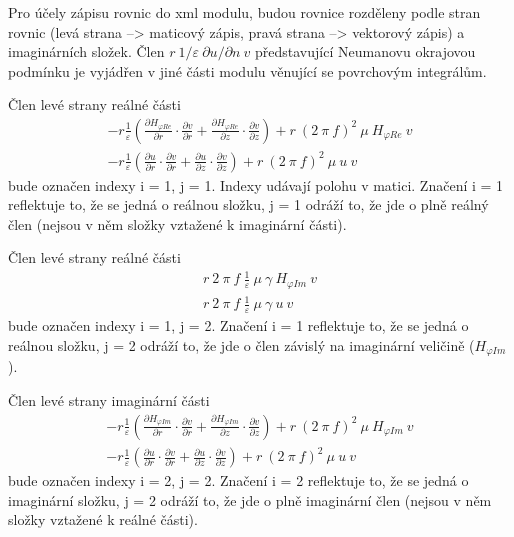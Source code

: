 \documentclass[12pt,a4paper,oneside]{article}
\numberwithin{equation}{section} %
\numberwithin{figure}{section} %
\numberwithin{table}{section} %
\begin{document}
Pro účely zápisu rovnic do xml modulu, budou rovnice rozděleny podle stran rovnic (levá strana --> maticový zápis, pravá strana --> vektorový zápis) a imaginárních složek. Člen $r ~ 1/ \varepsilon ~ \partial u / \partial n ~ v$ představující Neumanovu okrajovou podmínku je vyjádřen v jiné části modulu věnující se povrchovým integrálům.

Člen levé strany reálné části
\begin{subequations}
\begin{gather}
- r \frac{1}{\varepsilon} \left( \frac{\partial H _{\varphi Re}}{\partial r} \cdot \frac{\partial v}{\partial r} + \frac{\partial H _{\varphi Re}}{\partial z} \cdot \frac{\partial v}{\partial z} \right) + r ~ (2 ~ \pi ~ f) ^2 ~ \mu ~ H _{\varphi Re} ~ v
\\
- r \frac{1}{\varepsilon} \left( \frac{\partial u}{\partial r} \cdot \frac{\partial v}{\partial r} + \frac{\partial u}{\partial z} \cdot \frac{\partial v}{\partial z} \right) + r ~ (2 ~ \pi ~ f) ^2 ~ \mu  ~ u ~ v
\end{gather}
\end{subequations}
bude označen indexy i = 1, j = 1. Indexy udávají polohu v matici. Značení i = 1 reflektuje to, že se jedná o reálnou složku, j = 1 odráží to, že jde o plně reálný člen (nejsou v něm složky vztažené k imaginární části). 

Člen levé strany reálné části
\begin{subequations}
\begin{gather}
r ~ 2 ~ \pi ~ f ~ \frac{1}{\varepsilon} ~ \mu ~ \gamma ~ H _{\varphi Im} ~ v
\\
r ~ 2 ~ \pi ~ f ~ \frac{1}{\varepsilon} ~ \mu ~ \gamma ~ u ~ v
\end{gather}
\end{subequations}
bude označen indexy i = 1, j = 2. Značení i = 1 reflektuje to, že se jedná o reálnou složku, j = 2 odráží to, že jde o člen závislý na imaginární veličině ($H _{\varphi Im}$).


Člen levé strany imaginární části
\begin{subequations}
\begin{gather}
- r \frac{1}{\varepsilon} \left( \frac{\partial H _{\varphi Im}}{\partial r} \cdot \frac{\partial v}{\partial r} + \frac{\partial H _{\varphi Im}}{\partial z} \cdot \frac{\partial v}{\partial z} \right) + r ~ (2 ~ \pi ~ f) ^2 ~ \mu ~ H _{\varphi Im} ~ v
\\
- r \frac{1}{\varepsilon} \left( \frac{\partial u}{\partial r} \cdot \frac{\partial v}{\partial r} + \frac{\partial u}{\partial z} \cdot \frac{\partial v}{\partial z} \right) + r ~ (2 ~ \pi ~ f) ^2 ~ \mu ~ u ~ v
\end{gather}
\end{subequations}
bude označen indexy i = 2, j = 2. Značení i = 2 reflektuje to, že se jedná o imaginární složku, j = 2 odráží to, že jde o plně imaginární člen (nejsou v něm složky vztažené k reálné části). 
\end{document}
